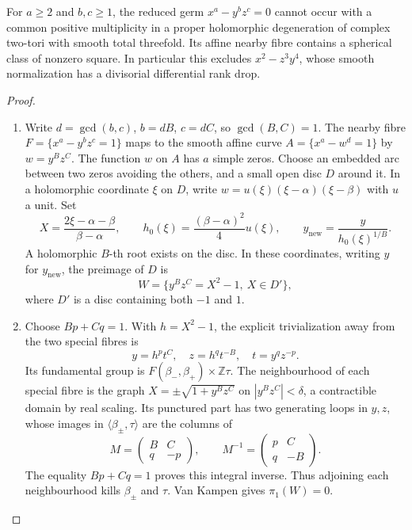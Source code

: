 \begin{proposition}\hypertarget{tag-02WP}{}\label{night:P4.18}\label{stmt:P4.18}

For $a\geq2$ and $b,c\geq1$, the reduced germ
$x^a-y^bz^c=0$ cannot occur with a common positive multiplicity
in a proper holomorphic degeneration of complex two-tori with
smooth total threefold. Its affine
nearby fibre contains a spherical class of nonzero square.
In particular this excludes $x^2-z^3y^4$, whose smooth
normalization has a divisorial differential rank drop.
\end{proposition}
\begin{proof}

\begin{enumerate}[label={$\langle1\rangle$\arabic*.},leftmargin=*]
\item Write $d=\gcd(b,c)$, $b=dB$, $c=dC$, so $\gcd(B,C)=1$.
The nearby fibre $F=\{x^a-y^bz^c=1\}$ maps to the smooth
affine curve $A=\{x^a-w^d=1\}$ by $w=y^Bz^C$.
The function $w$ on $A$ has $a$ simple zeros. Choose an
embedded arc between two zeros avoiding the others, and a
small open disc $D$ around it. In a holomorphic coordinate
$\xi$ on $D$, write $w=u(\xi)(\xi-\alpha)(\xi-\beta)$
with $u$ a unit. Set
\[
 X=\frac{2\xi-\alpha-\beta}{\beta-\alpha},\qquad
 h_0(\xi)=\frac{(\beta-\alpha)^2}{4}u(\xi),\qquad
 y_{\mathrm{new}}=\frac{y}{h_0(\xi)^{1/B}}.
\]
A holomorphic $B$-th root exists on the disc. In these coordinates,
writing $y$ for $y_{\mathrm{new}}$, the preimage of $D$ is
\[
 W=\{y^Bz^C=X^2-1,\ X\in D'\},
\]
where $D'$ is a disc containing both $-1$ and $1$.

\item Choose $Bp+Cq=1$. With $h=X^2-1$, the explicit trivialization
away from the two special fibres is
\[
 y=h^pt^C,\quad z=h^qt^{-B},\quad t=y^qz^{-p}.
\]
Its fundamental group is $F(\beta_-,\beta_+)\times\mathbb Z\tau$.
The neighbourhood of each special fibre is the graph
$X=\pm\sqrt{1+y^Bz^C}$ on $|y^Bz^C|<\delta$, a contractible
domain by real scaling. Its punctured part has two generating
loops in $y,z$, whose images in $\langle\beta_\pm,\tau\rangle$
are the columns of
\[
 M=\begin{pmatrix}B&C\\q&-p\end{pmatrix},\qquad
 M^{-1}=\begin{pmatrix}p&C\\q&-B\end{pmatrix}.
\]
The equality $Bp+Cq=1$ proves this integral inverse.
Thus adjoining each neighbourhood kills $\beta_\pm$ and $\tau$.
Van Kampen gives $\pi_1(W)=0$.


\end{enumerate}
\end{proof}
